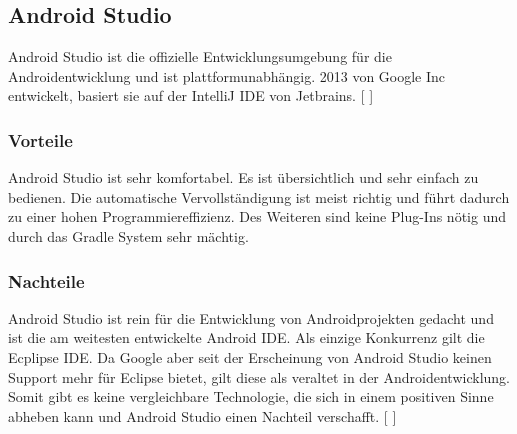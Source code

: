 \documentclass[FIPLY_base.tex]{subfiles}
\begin{document}
	\subsection{Android Studio}
	Android Studio ist die offizielle Entwicklungsumgebung für die Androidentwicklung und ist plattformunabhängig. 2013 von Google Inc entwickelt, basiert sie auf der IntelliJ IDE von Jetbrains.
	[ \cite{androidstudiodef}]  
	\subsubsection{Vorteile}
	Android Studio ist sehr komfortabel. Es ist übersichtlich und sehr einfach zu bedienen. Die automatische Vervollständigung ist meist richtig und führt dadurch zu einer hohen Programmiereffizienz. Des Weiteren sind keine Plug-Ins nötig und durch das Gradle System sehr mächtig.
	\subsubsection{Nachteile}
	Android Studio ist rein für die Entwicklung von Androidprojekten gedacht und ist die am weitesten entwickelte Android IDE. Als einzige \grqq{}Konkurrenz\grqq{} gilt die Ecplipse IDE. Da Google aber seit der Erscheinung von Android Studio keinen Support mehr für Eclipse bietet, gilt diese als veraltet in der Androidentwicklung. Somit gibt es keine vergleichbare Technologie, die sich in einem positiven Sinne abheben kann und Android Studio einen Nachteil verschafft.
	[ \cite{andrSupp}]  
\end{document}
